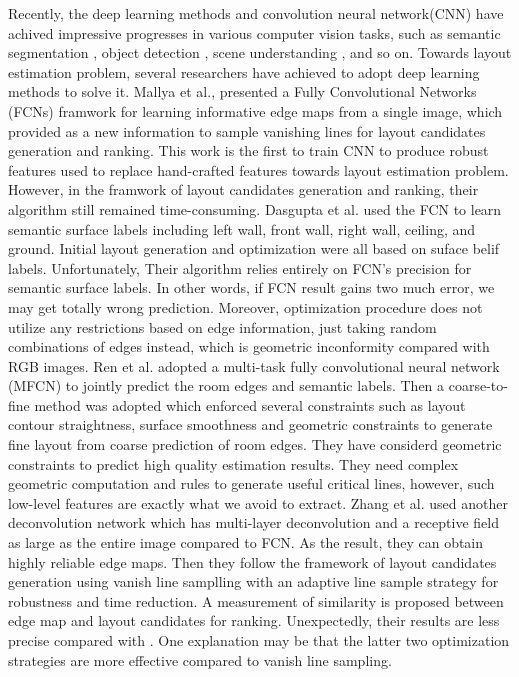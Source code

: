 {Recently, the deep learning methods and convolution neural network(CNN) have achived impressive progresses in various computer vision tasks, such as semantic segmentation \cite{long2015fully}\cite{chen2016deeplab}, object detection \cite{girshick2015fast}\cite{ren2015faster}, scene understanding \cite{gupta2015indoor}\cite{badrinarayanan2017segnet}, and so on. Towards layout estimation problem, several researchers have achieved to adopt deep learning methods to solve it. Mallya et al.\cite{mallya2015learning}, presented a Fully Convolutional Networks (FCNs)\cite{long2015fully} framwork for learning informative edge maps from a single image, which provided as a new information to sample vanishing lines for layout candidates generation and ranking. This work is the first to train CNN to produce robust features used to replace hand-crafted features towards layout estimation problem. However, in the framwork of layout candidates generation and ranking, their algorithm still remained time-consuming. Dasgupta et al.\cite{dasgupta2016delay} used the FCN to learn semantic surface labels including left wall, front wall, right wall, ceiling, and ground. Initial layout generation and optimization were all based on suface belif labels. Unfortunately, Their algorithm relies entirely on FCN's precision for semantic surface labels. In other words, if FCN result gains two much error, we may get totally wrong prediction. Moreover, optimization procedure does not utilize any restrictions based on edge information, just taking random combinations of edges instead, which is geometric inconformity compared with RGB images. Ren et al.\cite{ren2016coarse} adopted a multi-task fully convolutional neural network (MFCN) to jointly predict the room edges and semantic labels. Then a coarse-to-fine method was adopted which enforced several constraints such as layout contour straightness, surface smoothness and geometric constraints to generate fine layout from coarse prediction of room edges. They have considerd geometric constraints to predict high quality estimation results. They need complex geometric computation and rules to generate useful critical lines, however, such low-level features are exactly what we avoid to extract. Zhang et al.\cite{zhang2016learning} used another deconvolution network which has multi-layer deconvolution and a receptive field as large as the entire image compared to FCN. As the result, they can obtain highly reliable edge maps. Then they follow the framework of layout candidates generation using vanish line samplling with an adaptive line sample strategy for robustness and time reduction. A measurement of similarity is proposed between edge map and layout candidates for ranking. Unexpectedly, their results are less precise compared with \cite{dasgupta2016delay}\cite{ren2016coarse}. One explanation may be that the latter two optimization strategies are more effective compared to vanish line sampling.

}
